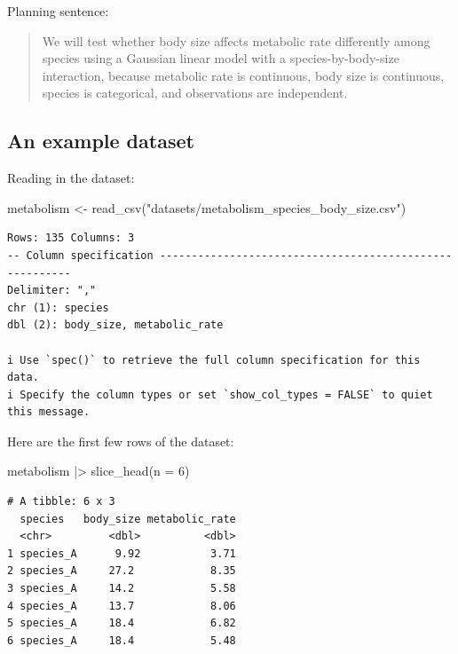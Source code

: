 \documentclass[
  letterpaper,
  8pt,
  a4paper]{book}
\newenvironment{Shaded}{\begin{snugshade}}{\end{snugshade}}
\newcommand{\AttributeTok}[1]{\textcolor[rgb]{0.40,0.45,0.13}{#1}}
\newcommand{\DecValTok}[1]{\textcolor[rgb]{0.68,0.00,0.00}{#1}}
\newcommand{\FunctionTok}[1]{\textcolor[rgb]{0.28,0.35,0.67}{#1}}
\newcommand{\NormalTok}[1]{\textcolor[rgb]{0.00,0.23,0.31}{#1}}
\newcommand{\OtherTok}[1]{\textcolor[rgb]{0.00,0.23,0.31}{#1}}
\newcommand{\SpecialCharTok}[1]{\textcolor[rgb]{0.37,0.37,0.37}{#1}}
\newcommand{\StringTok}[1]{\textcolor[rgb]{0.13,0.47,0.30}{#1}}
\begin{document}
Planning sentence:

\begin{quote}
We will test whether body size affects metabolic rate differently among
species using a Gaussian linear model with a species-by-body-size
interaction, because metabolic rate is continuous, body size is
continuous, species is categorical, and observations are independent.
\end{quote}

\subsection*{An example dataset}\label{an-example-dataset-2}

Reading in the dataset:

\begin{Shaded}
\begin{Highlighting}[]
\NormalTok{metabolism }\OtherTok{\textless{}{-}} \FunctionTok{read\_csv}\NormalTok{(}\StringTok{"datasets/metabolism\_species\_body\_size.csv"}\NormalTok{)}
\end{Highlighting}
\end{Shaded}

\begin{verbatim}
Rows: 135 Columns: 3
-- Column specification --------------------------------------------------------
Delimiter: ","
chr (1): species
dbl (2): body_size, metabolic_rate

i Use `spec()` to retrieve the full column specification for this data.
i Specify the column types or set `show_col_types = FALSE` to quiet this message.
\end{verbatim}

Here are the first few rows of the dataset:

\begin{Shaded}
\begin{Highlighting}[]
\NormalTok{metabolism }\SpecialCharTok{|\textgreater{}} 
  \FunctionTok{slice\_head}\NormalTok{(}\AttributeTok{n =} \DecValTok{6}\NormalTok{)}
\end{Highlighting}
\end{Shaded}

\begin{verbatim}
# A tibble: 6 x 3
  species   body_size metabolic_rate
  <chr>         <dbl>          <dbl>
1 species_A      9.92           3.71
2 species_A     27.2            8.35
3 species_A     14.2            5.58
4 species_A     13.7            8.06
5 species_A     18.4            6.82
6 species_A     18.4            5.48
\end{verbatim}
\end{document}
